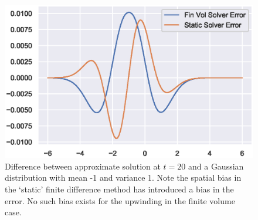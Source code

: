     \begin{figure}
        \centering
        \includegraphics[width=0.7\linewidth]{Figures/homkinerror}
        \caption[Error of the Schemes]{Difference between approximate solution at $t=20$ and a Gaussian distribution with mean -1 and variance 1. Note the spatial bias in the `static' finite difference method has introduced a bias in the error. No such bias exists for the upwinding in the finite volume case.}
        \label{fig:homkinerror}
    \end{figure}
